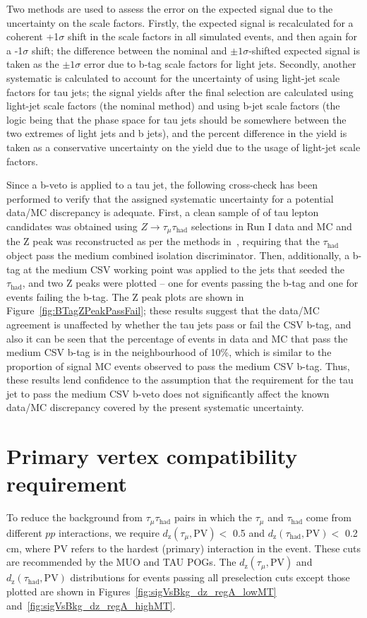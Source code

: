 Two methods are used to assess the error on the expected signal due to the uncertainty on the scale factors. Firstly, the expected signal is recalculated for a coherent +1$\sigma$ shift in the scale factors in all simulated events, and then again for a -1$\sigma$ shift; the difference between the nominal and $\pm1\sigma$-shifted expected signal is taken as the $\pm1\sigma$ error due to b-tag scale factors for light jets. Secondly, another systematic is calculated to account for the uncertainty of using light-jet scale factors for tau jets; the signal yields after the final selection are calculated using light-jet scale factors (the nominal method) and using b-jet scale factors (the logic being that the phase space for tau jets should be somewhere between the two extremes of light jets and b jets), and the percent difference in the yield is taken as a conservative uncertainty on the yield due to the usage of light-jet scale factors.

Since a b-veto is applied to a tau jet, the following cross-check has been performed to verify that the assigned systematic uncertainty for a potential data/MC discrepancy is adequate. First, a clean sample of of tau lepton candidates was obtained using $Z\rightarrow\tau_{\mu}\tau_{\text{had}}$ selections in Run I data and MC and the Z peak was reconstructed as per the methods in~\cite{Tau14001}, requiring that the $\tau_{\text{had}}$ object pass the medium combined isolation discriminator. Then, additionally, a b-tag at the medium CSV working point was applied to the jets that seeded the $\tau_{\text{had}}$, and two Z peaks were plotted -- one for events passing the b-tag and one for events failing the b-tag. The Z peak plots are shown in Figure~\ref{fig:BTagZPeakPassFail}; these results suggest that the data/MC agreement is unaffected by whether the tau jets pass or fail the CSV b-tag, and also it can be seen that the percentage of events in data and MC that pass the medium CSV b-tag is in the neighbourhood of 10\%, which is similar to the proportion of signal MC events observed to pass the medium CSV b-tag. Thus, these results lend confidence to the assumption that the requirement for the tau jet to pass the medium CSV b-veto does not significantly affect the known data/MC discrepancy covered by the present systematic uncertainty.

\section{Primary vertex compatibility requirement\label{sec:evtsel-dz}}
To reduce the background from $\tau_{\mu}\tau_{\text{had}}$ pairs in which the $\tau_{\mu}$ and $\tau_{\text{had}}$ come from different $pp$ interactions, we require $d_{\text{z}}(\tau_{\mu},\text{PV}) <$ 0.5 \cm and $d_{\text{z}}(\tau_{\text{had}},\text{PV}) <$ 0.2 cm, where PV refers to the hardest (primary) interaction in the event.  These cuts are recommended by the MUO and TAU POGs.  The $d_{\text{z}}(\tau_{\mu},\text{PV})$ and $d_{\text{z}}(\tau_{\text{had}},\text{PV})$ distributions for events passing all preselection cuts except those plotted are shown in Figures~\ref{fig:sigVsBkg_dz_regA_lowMT} and~\ref{fig:sigVsBkg_dz_regA_highMT}.

